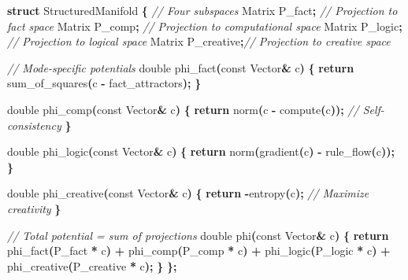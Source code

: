 \documentclass[
  11pt,
  a4paper,
]{article}
\newenvironment{Shaded}{\begin{snugshade}}{\end{snugshade}}
\newcommand{\AttributeTok}[1]{\textcolor[rgb]{0.13,0.29,0.53}{#1}}
\newcommand{\CommentTok}[1]{\textcolor[rgb]{0.56,0.35,0.01}{\textit{#1}}}
\newcommand{\ControlFlowTok}[1]{\textcolor[rgb]{0.13,0.29,0.53}{\textbf{#1}}}
\newcommand{\DataTypeTok}[1]{\textcolor[rgb]{0.13,0.29,0.53}{#1}}
\newcommand{\KeywordTok}[1]{\textcolor[rgb]{0.13,0.29,0.53}{\textbf{#1}}}
\newcommand{\NormalTok}[1]{#1}
\newcommand{\OperatorTok}[1]{\textcolor[rgb]{0.81,0.36,0.00}{\textbf{#1}}}
\begin{document}
\begin{Shaded}
\begin{Highlighting}[]
\KeywordTok{struct}\NormalTok{ StructuredManifold }\OperatorTok{\{}
    \CommentTok{// Four subspaces}
\NormalTok{    Matrix P\_fact}\OperatorTok{;}    \CommentTok{// Projection to fact space}
\NormalTok{    Matrix P\_comp}\OperatorTok{;}    \CommentTok{// Projection to computational space}
\NormalTok{    Matrix P\_logic}\OperatorTok{;}   \CommentTok{// Projection to logical space}
\NormalTok{    Matrix P\_creative}\OperatorTok{;}\CommentTok{// Projection to creative space}
    
    \CommentTok{// Mode{-}specific potentials}
    \DataTypeTok{double}\NormalTok{ phi\_fact}\OperatorTok{(}\AttributeTok{const}\NormalTok{ Vector}\OperatorTok{\&}\NormalTok{ c}\OperatorTok{)} \OperatorTok{\{}
        \ControlFlowTok{return}\NormalTok{ sum\_of\_squares}\OperatorTok{(}\NormalTok{c }\OperatorTok{{-}}\NormalTok{ fact\_attractors}\OperatorTok{);}
    \OperatorTok{\}}
    
    \DataTypeTok{double}\NormalTok{ phi\_comp}\OperatorTok{(}\AttributeTok{const}\NormalTok{ Vector}\OperatorTok{\&}\NormalTok{ c}\OperatorTok{)} \OperatorTok{\{}
        \ControlFlowTok{return}\NormalTok{ norm}\OperatorTok{(}\NormalTok{c }\OperatorTok{{-}}\NormalTok{ compute}\OperatorTok{(}\NormalTok{c}\OperatorTok{));}  \CommentTok{// Self{-}consistency}
    \OperatorTok{\}}
    
    \DataTypeTok{double}\NormalTok{ phi\_logic}\OperatorTok{(}\AttributeTok{const}\NormalTok{ Vector}\OperatorTok{\&}\NormalTok{ c}\OperatorTok{)} \OperatorTok{\{}
        \ControlFlowTok{return}\NormalTok{ norm}\OperatorTok{(}\NormalTok{gradient}\OperatorTok{(}\NormalTok{c}\OperatorTok{)} \OperatorTok{{-}}\NormalTok{ rule\_flow}\OperatorTok{(}\NormalTok{c}\OperatorTok{));}
    \OperatorTok{\}}
    
    \DataTypeTok{double}\NormalTok{ phi\_creative}\OperatorTok{(}\AttributeTok{const}\NormalTok{ Vector}\OperatorTok{\&}\NormalTok{ c}\OperatorTok{)} \OperatorTok{\{}
        \ControlFlowTok{return} \OperatorTok{{-}}\NormalTok{entropy}\OperatorTok{(}\NormalTok{c}\OperatorTok{);}  \CommentTok{// Maximize creativity}
    \OperatorTok{\}}
    
    \CommentTok{// Total potential = sum of projections}
    \DataTypeTok{double}\NormalTok{ phi}\OperatorTok{(}\AttributeTok{const}\NormalTok{ Vector}\OperatorTok{\&}\NormalTok{ c}\OperatorTok{)} \OperatorTok{\{}
        \ControlFlowTok{return}\NormalTok{ phi\_fact}\OperatorTok{(}\NormalTok{P\_fact }\OperatorTok{*}\NormalTok{ c}\OperatorTok{)} \OperatorTok{+}
\NormalTok{               phi\_comp}\OperatorTok{(}\NormalTok{P\_comp }\OperatorTok{*}\NormalTok{ c}\OperatorTok{)} \OperatorTok{+}
\NormalTok{               phi\_logic}\OperatorTok{(}\NormalTok{P\_logic }\OperatorTok{*}\NormalTok{ c}\OperatorTok{)} \OperatorTok{+}
\NormalTok{               phi\_creative}\OperatorTok{(}\NormalTok{P\_creative }\OperatorTok{*}\NormalTok{ c}\OperatorTok{);}
    \OperatorTok{\}}
\OperatorTok{\};}
\end{Highlighting}
\end{Shaded}
\end{document}
